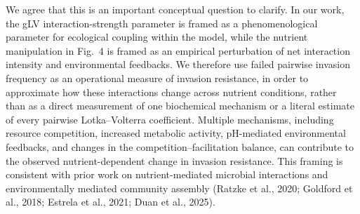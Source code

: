 \responselabel
We agree that this is an important conceptual question to clarify. In our work, the gLV interaction-strength parameter is framed as a phenomenological parameter for ecological coupling within the model, while the nutrient manipulation in Fig.~4 is framed as an empirical perturbation of net interaction intensity and environmental feedbacks. We therefore use failed pairwise invasion frequency as an operational measure of invasion resistance, in order to approximate how these interactions change across nutrient conditions, rather than as a direct measurement of one biochemical mechanism or a literal estimate of every pairwise Lotka--Volterra coefficient. Multiple mechanisms, including resource competition, increased metabolic activity, pH-mediated environmental feedbacks, and changes in the competition--facilitation balance, can contribute to the observed nutrient-dependent change in invasion resistance. This framing is consistent with prior work on nutrient-mediated microbial interactions and environmentally mediated community assembly (Ratzke et al., 2020; Goldford et al., 2018; Estrela et al., 2021; Duan et al., 2025).


